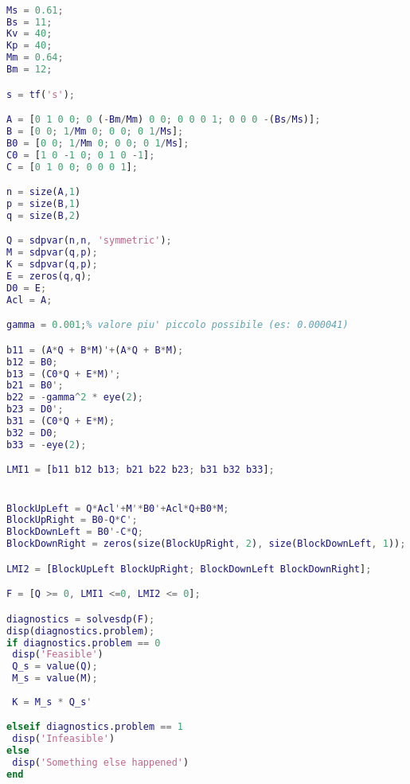 \documentclass{article}
\begin{document}
\begin{lstlisting}[language=Matlab]

Ms = 0.61;
Bs = 11;
Kv = 40;
Kp = 40;
Mm = 0.64;
Bm = 12;

s = tf('s');

A = [0 1 0 0; 0 (-Bm/Mm) 0 0; 0 0 0 1; 0 0 0 -(Bs/Ms)];
B = [0 0; 1/Mm 0; 0 0; 0 1/Ms];
B0 = [0 0; 1/Mm 0; 0 0; 0 1/Ms];
C0 = [1 0 -1 0; 0 1 0 -1];
C = [0 1 0 0; 0 0 0 1];

n = size(A,1)
p = size(B,1)
q = size(B,2)

Q = sdpvar(n,n, 'symmetric');
M = sdpvar(q,p);
K = sdpvar(q,p);
E = zeros(q,q);
D0 = E;
Acl = A;

gamma = 0.001;% valore piu' piccolo possibile (es: 0.000041)

b11 = (A*Q + B*M)'+(A*Q + B*M);
b12 = B0;
b13 = (C0*Q + E*M)';
b21 = B0';
b22 = -gamma^2 * eye(2);
b23 = D0';
b31 = (C0*Q + E*M);
b32 = D0;
b33 = -eye(2);

LMI1 = [b11 b12 b13; b21 b22 b23; b31 b32 b33];


BlockUpLeft = Q*Acl'+M'*B0'+Acl*Q+B0*M;
BlockUpRight = B0-Q*C';
BlockDownLeft = B0'-C*Q;
BlockDownRight = zeros(size(BlockUpRight, 2), size(BlockDownLeft, 1));

LMI2 = [BlockUpLeft BlockUpRight; BlockDownLeft BlockDownRight];

F = [Q >= 0, LMI1 <=0, LMI2 <= 0];

diagnostics = solvesdp(F);
disp(diagnostics.problem);
if diagnostics.problem == 0
 disp('Feasible')
 Q_s = value(Q);
 M_s = value(M);
 
 K = M_s * Q_s'

elseif diagnostics.problem == 1
 disp('Infeasible')
else
 disp('Something else happened')
end



\end{lstlisting}
\end{document}
